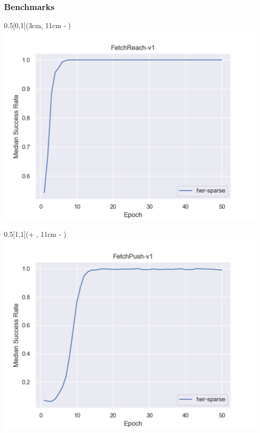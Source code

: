 \begin{frame}
	\frametitle{Benchmarks}	
	\vspace{1cm}
	
	
	\begin{textblock*}{0.5\paperwidth}[0,1](3cm, 11cm - \PraesentationSeitenrand)%
		\includegraphics[width=0.3\paperwidth]{./Ressourcen/Figures/fig_FetchReach-v1.pdf}
	\end{textblock*}
	
	\begin{textblock*}{0.5\paperwidth}[1,1](\textwidth + \PraesentationSeitenrand, 11cm - \PraesentationSeitenrand)%
		\includegraphics[width=0.3\paperwidth]{./Ressourcen/Figures/fig_FetchPush-v1.pdf}
	\end{textblock*}
	

\end{frame}
